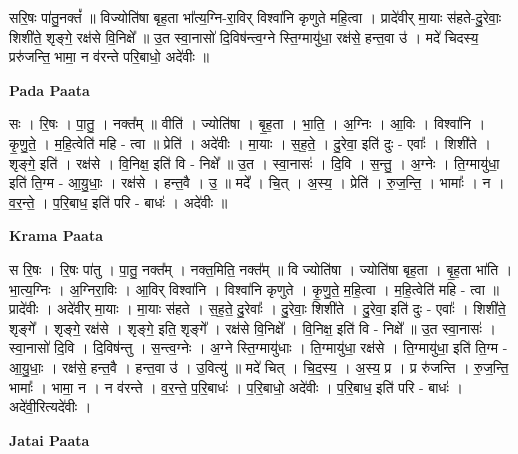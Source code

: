 \documentclass[17pt]{extarticle}
\begin{document}
सरि॒षः पा॑तु॒नक्तं᳚ ॥ विज्योति॑षा बृह॒ता भा᳚त्य॒ग्नि-रा॒विर् विश्वा॑नि कृणुते महि॒त्वा । प्रादे॑वीर् मा॒याः स॑हते-दु॒रेवाः॒ शिशी॑ते॒ शृङ्गे॒ रक्ष॑से वि॒निक्षे᳚ ॥ उ॒त स्वा॒नासो॑ दि॒विष॑न्त्व॒ग्ने स्ति॒ग्मायु॑धा॒ रक्ष॑से॒ हन्त॒वा उ॑ । मदे॑ चिदस्य॒ प्ररु॑जन्ति॒ भामा॒ न व॑रन्ते परि॒बाधो॒ अदे॑वीः ॥ \newline

\textbf{Pada Paata} \newline

सः । रि॒षः । पा॒तु॒ । नक्त᳚म् ॥ वीति॑ । ज्योति॑षा । बृ॒ह॒ता । भा॒ति॒ । अ॒ग्निः । आ॒विः । विश्वा॑नि । कृ॒णु॒ते॒ । म॒हि॒त्वेति॑ महि - त्वा ॥ प्रेति॑ । अदे॑वीः । मा॒याः । स॒ह॒ते॒ । दु॒रेवा॒ इति॑ दुः - एवाः᳚ । शिशी॑ते । शृङ्गे॒ इति॑ । रक्ष॑से । वि॒निक्ष॒ इति॑ वि - निक्षे᳚ ॥ उ॒त । स्वा॒नासः॑ । दि॒वि । स॒न्तु॒ । अ॒ग्नेः । ति॒ग्मायु॑धा॒ इति॑ ति॒ग्म - आ॒यु॒धाः॒ । रक्ष॑से । हन्त॒वै । उ॒ ॥ मदे᳚ । चि॒त् । अ॒स्य॒ । प्रेति॑ । रु॒ज॒न्ति॒ । भामाः᳚ । न । व॒र॒न्ते॒ । प॒रि॒बाध॒ इति॑ परि - बाधः॑ । अदे॑वीः ॥  \newline


\textbf{Krama Paata} \newline

स रि॒षः । रि॒षः पा॑तु । पा॒तु॒ नक्त᳚म् । नक्त॒मिति॒ नक्त᳚म् ॥ वि ज्योति॑षा । ज्योति॑षा बृह॒ता । बृ॒ह॒ता भा॑ति । भा॒त्य॒ग्निः । अ॒ग्निरा॒विः । आ॒विर् विश्वा॑नि । विश्वा॑नि कृणुते । कृ॒णु॒ते॒ म॒हि॒त्वा । म॒हि॒त्वेति॑ महि - त्वा ॥ प्रादे॑वीः । अदे॑वीर् मा॒याः । मा॒याः स॑हते । स॒ह॒ते॒ दु॒रेवाः᳚ । दु॒रेवाः॒ शिशी॑ते । दु॒रेवा॒ इति॑ दुः - एवाः᳚ । शिशी॑ते॒ शृङ्गे᳚ । शृङ्गे॒ रक्ष॑से । शृङ्गे॒ इति॒ शृङ्गे᳚ । रक्ष॑से वि॒निक्षे᳚ । वि॒निक्ष॒ इति॑ वि - निक्षे᳚ ॥ उ॒त स्वा॒नासः॑ । स्वा॒नासो॑ दि॒वि । दि॒विष॑न्तु । स॒न्त्व॒ग्नेः । अ॒ग्ने स्ति॒ग्मायु॑धाः । ति॒ग्मायु॑धा॒ रक्ष॑से । ति॒ग्मायु॑धा॒ इति॑ ति॒ग्म - आ॒यु॒धाः॒ । रक्ष॑से॒ हन्त॒वै । हन्त॒वा उ॑ । उ॒वित्यु॑ ॥ मदे॑ चित् । चि॒द॒स्य॒ । अ॒स्य॒ प्र । प्र रु॑जन्ति । रु॒ज॒न्ति॒ भामाः᳚ । भामा॒ न । न व॑रन्ते । व॒र॒न्ते॒ प॒रि॒बाधः॑ । प॒रि॒बाधो॒ अदे॑वीः । प॒रि॒बाध॒ इति॑ परि - बाधः॑ । अदे॑वी॒रित्यदे॑वीः । \newline

\textbf{Jatai Paata} \newline
\end{document}
